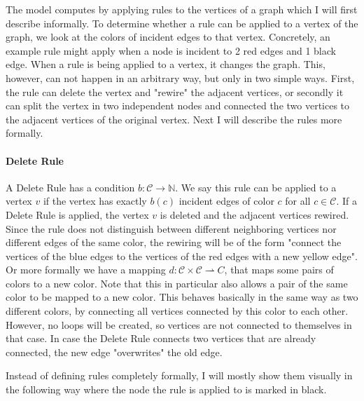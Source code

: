 \documentclass{article}
\newcommand{\C}{\mathcal{C}}
\newcommand{\N}{\mathbb{N}}
\begin{document}
The model computes by applying rules to the vertices of a graph which I will first describe informally.
To determine whether a rule can be applied to a vertex of the graph, we look at the colors of incident edges to that vertex.
Concretely, an example rule might apply when a node is incident to 2 red edges and 1 black edge.
When a rule is being applied to a vertex, it changes the graph.
This, however, can not happen in an arbitrary way, but only in two simple ways.
First, the rule can delete the vertex and "rewire" the adjacent vertices, or secondly it can split the vertex in two independent nodes and connected the two vertices to the adjacent vertices of the original vertex.
Next I will describe the rules more formally.

\paragraph*{Delete Rule} A Delete Rule has a condition $b : \C \to \N$.
We say this rule can be applied to a vertex $v$ if the vertex has exactly $b(c)$ incident edges of color $c$ for all $c \in \C$.
If a Delete Rule is applied, the vertex $v$ is deleted and the adjacent vertices rewired.
Since the rule does not distinguish between different neighboring vertices nor different edges of the same color, the rewiring will be of the form "connect the vertices of the blue edges to the vertices of the red edges with a new yellow edge".
Or more formally we have a mapping $d: \C \times \C \rightharpoonup C$, that maps some pairs of colors to a new color.
Note that this in particular also allows a pair of the same color to be mapped to a new color.
This behaves basically in the same way as two different colors, by connecting all vertices connected by this color to each other.
However, no loops will be created, so vertices are not connected to themselves in that case.
In case the Delete Rule connects two vertices that are already connected, the new edge "overwrites" the old edge.

Instead of defining rules completely formally, I will mostly show them visually in the following way where the node the rule is applied to is marked in black.
\end{document}
